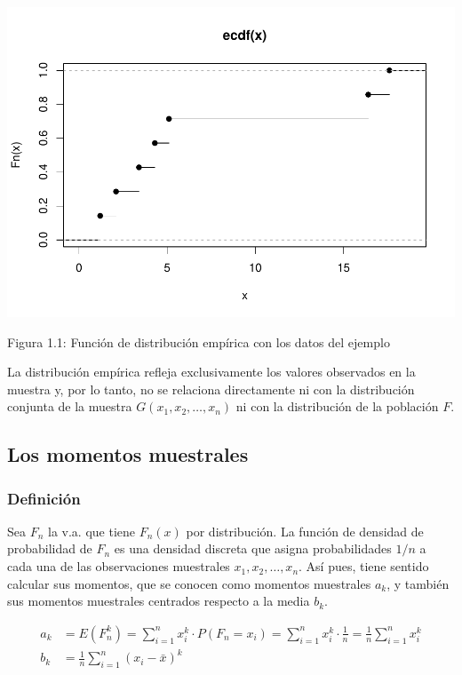 \documentclass[
]{article}
\begin{document}
\includegraphics{FundamentosInferenciaEstadistica_files/figure-latex/unnamed-chunk-16-1.pdf}

Figura 1.1: Función de distribución empírica con los datos del ejemplo

La distribución empírica refleja exclusivamente los valores observados en la muestra y, por lo tanto, no se relaciona directamente ni con la distribución conjunta de la muestra \(G\left(x_{1}, x_{2}, \ldots, x_{n}\right)\) ni con la distribución de la población \(F\).

\subsection{Los momentos muestrales}\label{los-momentos-muestrales}

\subsubsection{Definición}\label{definiciuxf3n-3}

Sea \(F_{n}\) la v.a. que tiene \(F_{n}(x)\) por distribución. La función de densidad de probabilidad de \(F_{n}\) es una densidad discreta que asigna probabilidades \(1 / n\) a cada una de las observaciones muestrales \(x_{1}, x_{2}, \ldots, x_{n}\). Así pues, tiene sentido calcular sus momentos, que se conocen como momentos muestrales \(a_{k}\), y también sus momentos muestrales centrados respecto a la media \(b_{k}\).

\[
\begin{aligned}
a_{k} & =E\left(F_{n}^{k}\right)=\sum_{i=1}^{n} x_{i}^{k} \cdot P\left(F_{n}=x_{i}\right)=\sum_{i=1}^{n} x_{i}^{k} \cdot \frac{1}{n}=\frac{1}{n} \sum_{i=1}^{n} x_{i}^{k} \\
b_{k} & =\frac{1}{n} \sum_{i=1}^{n}\left(x_{i}-\bar{x}\right)^{k}
\end{aligned}
\]
\end{document}
